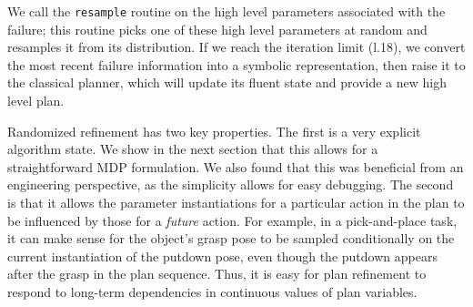 We call the \texttt{resample} routine on the high level parameters
associated with the failure; this routine picks one of these high level parameters at random and
resamples it from its distribution. If we reach the iteration limit (l.18),
we convert the most recent failure information into a symbolic representation, then raise it
to the classical planner, which will update its fluent state and provide a new
high level plan.

Randomized refinement has two key properties. The first is a very explicit algorithm state.
We show in the next section that this allows for a straightforward MDP
formulation. We also found that this was beneficial from an
engineering perspective, as the simplicity allows for easy debugging. The second is that
 it allows the parameter instantiations for a particular action in
the plan to be influenced by those for a \emph{future} action. For example, in a
pick-and-place task, it can make sense for the object's grasp pose to be sampled
conditionally on the current instantiation of the putdown pose, even though the putdown
appears after the grasp in the plan sequence. Thus, it is easy for plan refinement to
respond to long-term dependencies in continuous values of plan variables.